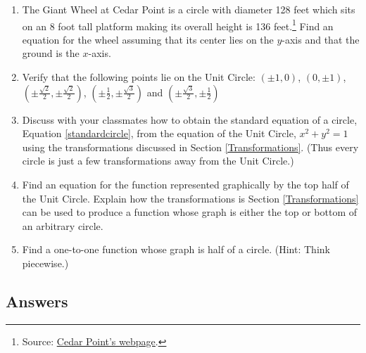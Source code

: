 \begin{enumerate}
\setcounter{enumi}{\value{HW}}

\item The Giant Wheel at Cedar Point is a circle with diameter 128 feet which sits on an 8 foot tall platform making its overall height is 136 feet.\footnote{Source: \href{http://www.cedarpoint.com/public/park/rides/tranquil/giant_wheel.cfm}{\underline{Cedar Point's webpage}}.}  Find an equation for the wheel assuming that its center lies on the $y$-axis and that the ground is the $x$-axis.
\label{giantwheelcircle}

\item Verify that the following points lie on the Unit Circle: $(\pm 1, 0)$, $(0, \pm 1)$, $\left(\pm \frac{\sqrt{2}}{2}, \pm \frac{\sqrt{2}}{2}\right)$, $\left(\pm \frac{1}{2}, \pm \frac{\sqrt{3}}{2}\right)$ and  $\left(\pm \frac{\sqrt{3}}{2}, \pm \frac{1}{2}\right)$


\item \label{circletransunitcircleexercise} Discuss with your classmates how to obtain the standard equation of a circle, Equation \ref{standardcircle}, from the equation of the Unit Circle, $x^2+y^2=1$ using the transformations discussed in Section \ref{Transformations}.  (Thus every circle is just a few transformations away from the Unit Circle.)

\item Find an equation for the function represented graphically by the top half of the Unit Circle.  Explain how the transformations is Section \ref{Transformations} can be used to produce a function whose graph is either the top or bottom of an arbitrary circle.

\item Find a one-to-one function whose graph is half of a circle.  (Hint: Think piecewise.)

\end{enumerate}

\newpage

\subsection{Answers}

